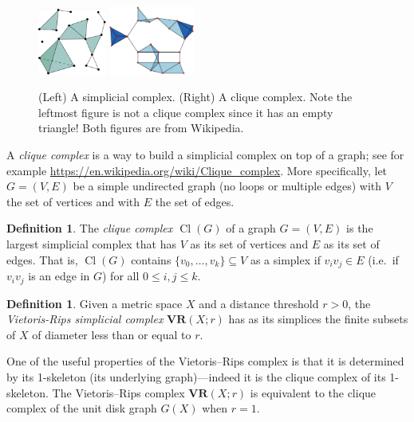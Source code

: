 \documentclass[amscd, amssymb, verbatim]{amsart}[12pt]
\theoremstyle{plain}
\theoremstyle{definition}
\newtheorem{definition}[lemma]{Definition}
\DeclareMathOperator{\cl}{Cl}
\begin{document}
\begin{figure}[h]
\centering
\includegraphics[width=0.2\textwidth]{SimplicialComplex.png}
\hspace{20mm}
\includegraphics[width=0.25\textwidth]{CliqueComplex.png}
\caption{(Left) A simplicial complex. (Right) A clique complex.
Note the leftmost figure is not a clique complex since it has an empty triangle!
Both figures are from Wikipedia.}
\label{fig:simplicialComplex}
\end{figure}

A \emph{clique complex} is a way to build a simplicial complex on top of a graph; see for example \url{https://en.wikipedia.org/wiki/Clique\_complex}.
More specifically, let $G=(V,E)$ be a simple undirected graph (no loops or multiple edges) with $V$ the set of vertices and with $E$ the set of edges.

\begin{definition}
The \emph{clique complex $\cl(G)$} of a graph $G=(V,E)$ is the largest simplicial complex that has $V$ as its set of vertices and $E$ as its set of edges.
That is, $\cl(G)$ contains $\{v_0,\ldots,v_k\}\subseteq V$ as a simplex if $v_iv_j\in E$ (i.e.\ if $v_iv_j$ is an edge in $G$) for all $0\le i,j\le k$.
\end{definition}

\begin{definition}
Given a metric space $X$ and a distance threshold $r>0$, the \emph{Vietoris-Rips simplicial complex} $\textbf{VR}(X;r)$ has as its simplices the finite subsets of $X$ of diameter less than or equal to $r$.
\end{definition}

One of the useful properties of the Vietoris--Rips complex is that it is determined by its 1-skeleton (its underlying graph)---indeed it is the clique complex of its 1-skeleton.
The Vietoris--Rips complex $\textbf{VR}(X;r)$ is equivalent to the clique complex of the unit disk graph $G(X)$ when $r=1$.
\end{document}
